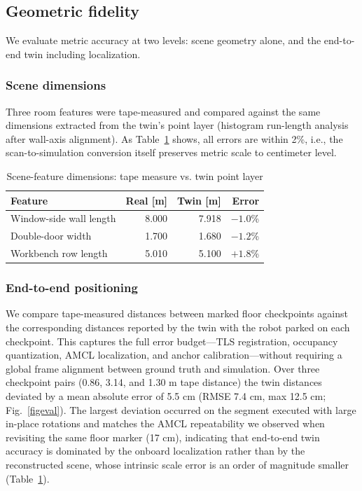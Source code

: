 \documentclass[conference]{IEEEtran}
\begin{document}
\subsection{Geometric fidelity}
We evaluate metric accuracy at two levels: scene geometry alone, and
the end-to-end twin including localization.

\subsubsection{Scene dimensions} Three room features were
tape-measured and compared against the same dimensions extracted from
the twin's point layer (histogram run-length analysis after wall-axis
alignment). As Table~\ref{tabgeo} shows, all errors are within 2\%,
i.e., the scan-to-simulation conversion itself preserves metric scale
to centimeter level.

\begin{table}[htbp]
\caption{Scene-feature dimensions: tape measure vs. twin point layer}
\begin{center}
\begin{tabular}{|l|r|r|r|}
\hline
\textbf{Feature} & \textbf{Real [m]} & \textbf{Twin [m]} & \textbf{Error} \\
\hline
Window-side wall length & 8.000 & 7.918 & $-1.0$\% \\
Double-door width & 1.700 & 1.680 & $-1.2$\% \\
Workbench row length & 5.010 & 5.100 & $+1.8$\% \\
\hline
\end{tabular}
\label{tabgeo}
\end{center}
\end{table}

\subsubsection{End-to-end positioning} We compare tape-measured
distances between marked floor checkpoints against the corresponding
distances reported by the twin with the robot parked on each
checkpoint. This captures the full error budget---TLS registration,
occupancy quantization, AMCL localization, and anchor
calibration---without requiring a global frame alignment between
ground truth and simulation. Over three checkpoint pairs (0.86, 3.14,
and 1.30 m tape distance) the twin distances deviated by a mean
absolute error of 5.5 cm (RMSE 7.4 cm, max 12.5 cm;
Fig.~\ref{figeval}). The largest deviation occurred on the segment
executed with large in-place rotations and matches the AMCL
repeatability we observed when revisiting the same floor marker
(17 cm), indicating that end-to-end twin accuracy is dominated by the
onboard localization rather than by the reconstructed scene, whose
intrinsic scale error is an order of magnitude smaller
(Table~\ref{tabgeo}).
\end{document}
